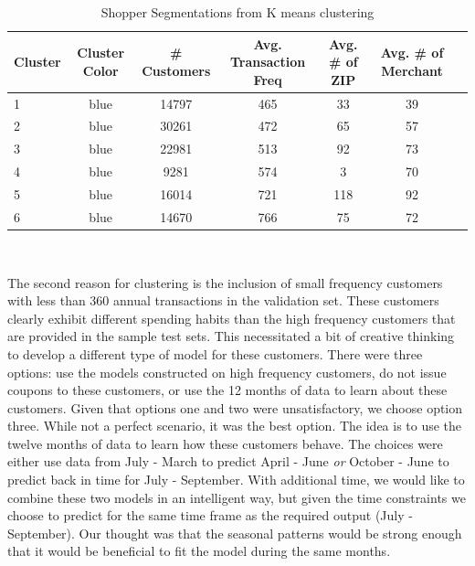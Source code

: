\documentclass[12pt]{article} %
\begin{document}
\begin{table}[h!]\footnotesize
\centering
\vspace{10pt}
\caption{Shopper Segmentations from K means clustering}
\begin{tabular}{l*{5}{c}r}
\hline
Cluster & Cluster Color & \# Customers & Avg. Transaction Freq & Avg. \# of ZIP &  Avg. \# of Merchant \\
\hline
1	& blue&14797	&465 	&33 &	39\\
2	&blue&30261	&472 	&65	&57\\
3	&blue&22981	&513 	&92 &	73\\
4	&blue&9281	&574 	&3 	&70 \\
5	&blue&16014	&721 	&118 &	92\\
6	&blue&14670	&766 	&75 &	72\\
\hline
\end{tabular}\\
\label{table1}
\end{table}
The second reason for clustering is the inclusion of small frequency customers with less than 360 annual transactions in the validation set.  These customers clearly exhibit different spending habits than the high frequency customers that are provided in the sample test sets.  This necessitated a bit of creative thinking to develop a different type of model for these customers.  There were three options: use the models constructed on high frequency customers, do not issue coupons to these customers, or use the 12 months of data to learn about these customers.  Given that options one and two were unsatisfactory, we choose option three.  While not a perfect scenario, it was the best option.   The idea is to use the twelve months of data to learn how these customers behave.  The choices were either use data from July - March to predict April - June \emph{or}  October - June to predict back in time for July - September.  With additional time, we would like to combine these two models in an intelligent way, but given the time constraints we choose to predict for the same time frame as the required output (July - September).  Our thought was that the seasonal patterns would be strong enough that it would be beneficial to fit the model during the same months.
\end{document}
